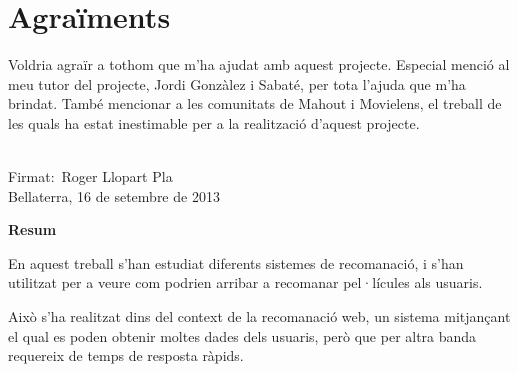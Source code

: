 \documentclass[a4paper,12pt,catalan]{book}
\begin{document}
\chapter*{Agraïments}

Voldria agraïr a tothom que m'ha ajudat amb aquest projecte. Especial menció al meu tutor del projecte, Jordi Gonzàlez i Sabaté, per tota l'ajuda que m'ha brindat. També mencionar a les comunitats de Mahout i Movielens, el treball de les quals ha estat inestimable per a la realització d'aquest projecte.

\tableofcontents

\newpage
{}
\pagestyle{headings}








\cleardoublepage
{}
{}
\printbibliography
\cleardoublepage

\pagestyle{plain} 
\vspace*{6cm} 
\begin{center} 
\begin{minipage}{4in} 
\parindent=0pt \vspace*{1in} 
\begin{center} 
\vrule width 3in height 0.4pt
\\Firmat:\ Roger Llopart Pla
\\ Bellaterra, 16 de setembre de 2013
\end{center} 
\end{minipage} 
\end{center} 

\newpage 

\thispagestyle{empty}

\vfill{}
{\par\centering \textbf{\large Resum}\large \par}

En aquest treball s'han estudiat diferents sistemes de recomanació, i s'han utilitzat per a veure com podrien arribar a recomanar pel·lícules als usuaris.

Això s'ha realitzat dins del context de la recomanació web, un sistema mitjançant el qual es poden obtenir moltes dades dels usuaris, però que per altra banda requereix de temps de resposta ràpids.

\vfill{}
\end{document}

